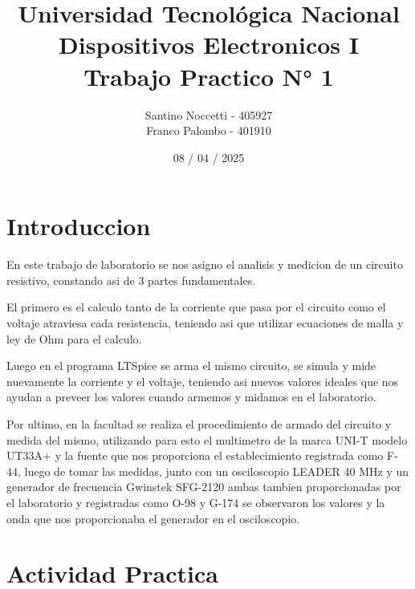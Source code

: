\documentclass[a4paper,12pt, spanish]{report}
\title{%
\setlength{\headwidth}{\textwidth} %
\setlength{\headheight}{15pt}  %
\setlength{\headsep}{10pt}     %
  \fontsize{25}{0}\selectfont Universidad Tecnológica Nacional \\
  \fontsize{22}{30}\selectfont Dispositivos Electronicos I \\
  \fontsize{20}{25}\selectfont Trabajo Practico N° 1
}
\author{
  Santino Noccetti - 405927\\
  Franco Palombo - 401910\\
}
\date{08 / 04 / 2025}
\newcommand\myemptypage{
  \newpage
  \null
  \thispagestyle{empty}
  \addtocounter{page}{-1}
  \newpage
}
\begin{document}
  \maketitle

  \myemptypage

  \tableofcontents
  \thispagestyle{plain}

  \myemptypage

  \chapter{Introduccion}
    En este trabajo de laboratorio se nos asigno el analisis y medicion de un circuito resistivo, constando asi de 3 partes fundamentales.

    
    El primero es el calculo tanto de la corriente que pasa por el circuito como el voltaje atraviesa cada resistencia, teniendo asi que utilizar ecuaciones de malla y ley de Ohm para el calculo.

    Luego en el programa LTSpice se arma el mismo circuito, se simula y mide nuevamente la corriente y el voltaje, teniendo asi nuevos valores ideales que nos ayudan a preveer los valores cuando armemos y midamos en el laboratorio.

    Por ultimo, en la facultad se realiza el procedimiento de armado del circuito y medida del mismo, utilizando para esto el multimetro de la marca UNI-T modelo UT33A+ y la fuente que nos proporciona el establecimiento registrada como F-44, luego de tomar las medidas, junto con un osciloscopio LEADER 40 MHz y un generador de frecuencia Gwinstek SFG-2120 ambas tambien proporcionadas por el laboratorio y registradas como O-98 y G-174 se observaron los valores y la onda que nos proporcionaba el generador en el osciloscopio.
    


  \chapter{Actividad Practica}
\end{document}
